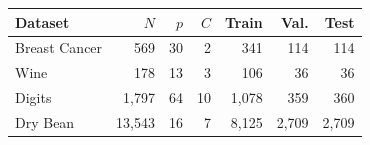 \begin{tabular}{lrrrrrr}
\toprule
Dataset & $N$ & $p$ & $C$ & Train & Val. & Test \\
\midrule
Breast Cancer & 569 & 30 & 2 & 341 & 114 & 114 \\
Wine & 178 & 13 & 3 & 106 & 36 & 36 \\
Digits & 1,797 & 64 & 10 & 1,078 & 359 & 360 \\
Dry Bean & 13,543 & 16 & 7 & 8,125 & 2,709 & 2,709 \\
\bottomrule
\end{tabular}
